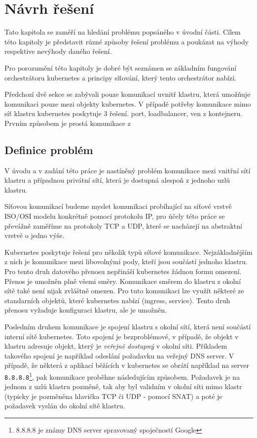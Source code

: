 \chapter{Návrh řešení}

\begin{chapterabstract}
Tato kapitola se zaměří na hledání problému popsáného v úvodní části. Cílem této kapitoly je představit různé způsoby řešení problému a poukázat na výhody respektive nevýhody daného řešení.

Pro porozumění této kapitoly je dobré být seznámen se základním fungování orchestrátoru kubernetes a principy síťování, který tento orchestrátor nabízí.  
\end{chapterabstract}
Předchozí dvě sekce se zabývali pouze komunikací uvnitř klastru, která umožňuje komunikaci pouze mezi objekty kubernetes. V případě potřeby komunikace mimo síť klastru kubernetes poskytuje 3 řešení. port, loadbalancer, ven z kontejneru.
Prvním způsobem je prostá komunikace z 


\section{Definice problém}
V úvodu a v zadání této práce je nastíněný problém komunikace mezi vnitřní sítí klastru a případnou privátní sítí, která je dostupná alespoň z jednoho uzlů klastru. 

Síťovou komunikací budeme myslet komunikaci probíhající na síťové vrstvě ISO/OSI modelu konkrétně pomocí protokolu IP, pro účely této práce se převážně zaměříme na protokoly TCP a UDP, které se nacházejí na abstraktní vrstvě o jedno výše.

Kubernetes poskytuje řešení pro několik typů síťové komunikace. Nejzákladnějším z nich je komunikace mezi libovolnými pody, kteří jsou součástí jednoho klastru. Pro tento druh datového přenosu nepřináší kubernetes žádnou formu omezení. Přenos je umožněn plně všemi směry. Komunikace směrem do klastru z okolní sítě také není nijak zvláštně omezen. Pro tuto komunikaci lze využít některé ze standarních objektů, které kubernetes nabízí (ingress, service). Tento druh přenosu vyžaduje konfiguraci klastru, ale je umožněn.

Posledním druhem komunikace je spojení klastru s okolní sítí, která není součástí interní sítě kubernetes. Toto spojení je bezproblémové, v případě, že objekt v klastru adresuje objekt, který je \textit{veřejně dostupný} v okolní síti. Příkladem takového spojení je například odeslání požadavku na veřejný DNS server. V případě, že některá z aplikací běžících v kubernetes se obrátí například na server \verb|8.8.8.8|\footnote{8.8.8.8 je známy DNS server spravovaný spoječností Google}, pak komunikace proběhne následujícím způsobem. Požadavek je na jednom z uzlů klastru pozměně, tak aby byl validním v okolní síti mimo klastr (typicky je pozměněna hlavička TCP či UDP - pomocí SNAT) a poté je požadavek vyslán do okolní sítě klastru.


